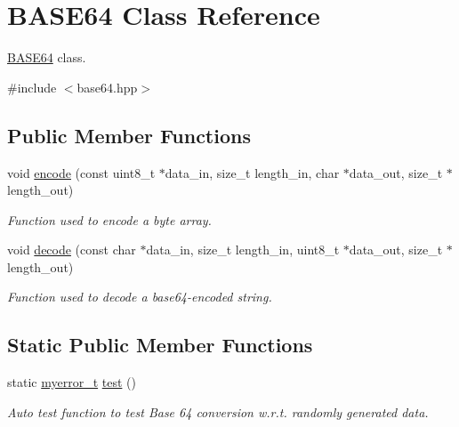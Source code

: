 \hypertarget{classBASE64}{}\section{B\+A\+S\+E64 Class Reference}
\label{classBASE64}


\hyperlink{classBASE64}{B\+A\+S\+E64} class.  




{\ttfamily \#include $<$base64.\+hpp$>$}

\subsection*{Public Member Functions}
\begin{DoxyCompactItemize}
\item 
void \hyperlink{classBASE64_af53fb889508f2903fdb773ef901141bb}{encode} (const uint8\+\_\+t $\ast$data\+\_\+in, size\+\_\+t length\+\_\+in, char $\ast$data\+\_\+out, size\+\_\+t $\ast$length\+\_\+out)
\begin{DoxyCompactList}\small\item\em Function used to encode a byte array. \end{DoxyCompactList}\item 
void \hyperlink{classBASE64_a4c67a6107a7cebeaa7f42068b2b9ba07}{decode} (const char $\ast$data\+\_\+in, size\+\_\+t length\+\_\+in, uint8\+\_\+t $\ast$data\+\_\+out, size\+\_\+t $\ast$length\+\_\+out)
\begin{DoxyCompactList}\small\item\em Function used to decode a base64-\/encoded string. \end{DoxyCompactList}\end{DoxyCompactItemize}
\subsection*{Static Public Member Functions}
\begin{DoxyCompactItemize}
\item 
static \hyperlink{error_8hpp_acabd2917084445509becf54ab64a4bd0}{myerror\+\_\+t} \hyperlink{classBASE64_a1f7d6fc0902417dff2d5cece476a3aba}{test} ()
\begin{DoxyCompactList}\small\item\em Auto test function to test Base 64 conversion w.\+r.\+t. randomly generated data. \end{DoxyCompactList}\end{DoxyCompactItemize}

